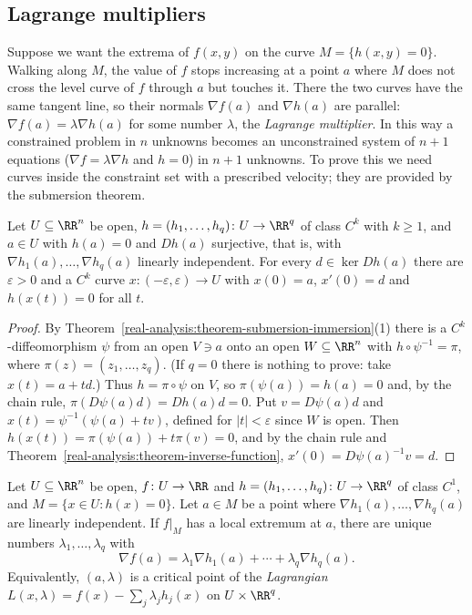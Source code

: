 \subsection{Lagrange multipliers}\label{real-analysis:subsection-lagrange}

Suppose we want the extrema of $f(x, y)$ on the curve $M = \{h(x, y) = 0\}$. Walking along $M$, the value of $f$ stops increasing at a point $a$ where $M$ does not cross the level curve of $f$
through $a$ but touches it. There the two curves have the same tangent line, so their normals $\nabla f(a)$ and $\nabla h(a)$ are parallel: $\nabla f(a) = \lambda\nabla h(a)$ for some number $\lambda$, the
\emph{Lagrange multiplier}. In this way a constrained problem in $n$ unknowns becomes an unconstrained system of $n + 1$ equations ($\nabla f = \lambda\nabla h$ and $h = 0$) in $n + 1$ unknowns. To prove
this we need curves inside the constraint set with a prescribed velocity; they are provided by the submersion theorem.

\begin{lemma}\label{real-analysis:lemma-curves-level-set}
Let $U \subseteq \RR^n$ be open, $h = (h_1, \ldots, h_q) \colon U \to \RR^q$ of class $C^k$ with $k \geq 1$, and $a \in U$ with $h(a) = 0$ and $Dh(a)$ surjective, that is, with $\nabla h_1(a), \ldots,
\nabla h_q(a)$ linearly independent. For every $d \in \ker Dh(a)$ there are $\varepsilon > 0$ and a $C^k$ curve $x \colon (-\varepsilon, \varepsilon) \to U$ with $x(0) = a$, $x'(0) = d$ and $h(x(t)) = 0$ for
all $t$.
\end{lemma}

\begin{proof}
By Theorem~\ref{real-analysis:theorem-submersion-immersion}(1) there is a $C^k$-diffeomorphism $\psi$ from an open $V \ni a$ onto an open $W \subseteq \RR^n$ with $h \circ \psi^{-1} = \pi$, where
$\pi(z) = (z_1, \ldots, z_q)$. (If $q = 0$ there is nothing to prove: take $x(t) = a + td$.) Thus $h = \pi \circ \psi$ on $V$, so $\pi(\psi(a)) = h(a) = 0$ and, by the chain rule, $\pi(D\psi(a)d) =Dh(a)d = 0$.
Put $v = D\psi(a)d$ and $x(t) = \psi^{-1}(\psi(a) + tv)$, defined for $|t| < \varepsilon$ since $W$ is open. Then $h(x(t)) = \pi(\psi(a)) + t\pi(v) = 0$, and by the chain rule and
Theorem~\ref{real-analysis:theorem-inverse-function}, $x'(0) = D\psi(a)^{-1}v = d$.
\end{proof}

\begin{theorem}\label{real-analysis:theorem-lagrange}
Let $U \subseteq \RR^n$ be open, $f \colon U \to \RR$ and $h = (h_1, \ldots, h_q) \colon U \to \RR^q$ of class $C^1$, and $M = \{x \in U : h(x) = 0\}$. Let $a \in M$ be a point where
$\nabla h_1(a), \ldots, \nabla h_q(a)$ are linearly independent. If $f|_M$ has a local extremum at $a$, there are unique numbers $\lambda_1, \ldots, \lambda_q$ with
\begin{equation}\label{real-analysis:equation-lagrange}
\nabla f(a) = \lambda_1\nabla h_1(a) + \cdots + \lambda_q\nabla h_q(a).
\end{equation}
Equivalently, $(a, \lambda)$ is a critical point of the \emph{Lagrangian} $L(x, \lambda) = f(x) - \sum_j\lambda_jh_j(x)$ on $U \times \RR^q$.
\end{theorem}

